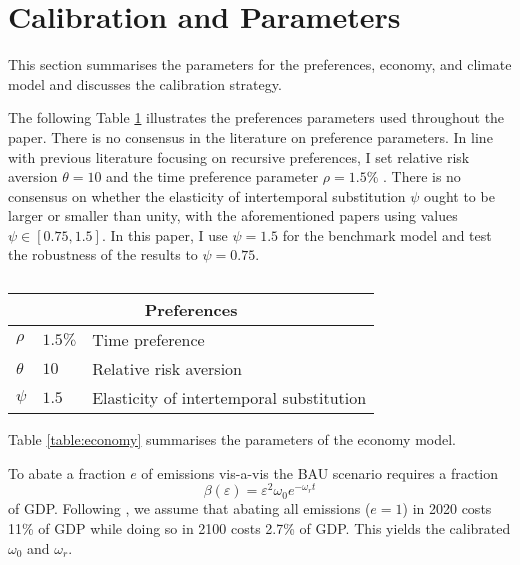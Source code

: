 \documentclass[../../main.tex]{subfiles}
\begin{document}
\section{Calibration and Parameters} \label{appendix:calibration}

This section summarises the parameters for the preferences, economy, and climate model and discusses the calibration strategy.

The following Table \ref{table:preferences} illustrates the preferences parameters used throughout the paper. There is no consensus in the literature on preference parameters. In line with previous literature focusing on recursive preferences, I set relative risk aversion $\theta = 10$ \citep{ackerman_epsteinzin_2013,crost_optimal_2013,lontzek_stochastic_2015} and the time preference parameter $\rho = 1.5\%$ \citep{nordhaus_estimates_2014}. There is no consensus on whether the elasticity of intertemporal substitution $\psi$ ought to be larger or smaller than unity, with the aforementioned papers using values $\psi \in [0.75, 1.5]$. In this paper, I use $\psi = 1.5$ for the benchmark model and test the robustness of the results to $\psi = 0.75$.

\begin{table}[htbp]
    \centering
    \begin{tabular}{ |p{1cm}||p{3cm}|p{8cm}|}
        \hline
        \multicolumn{3}{|c|}{Preferences} \\
        \hline
        $\rho$ & $1.5\%$ & Time preference \\
        $\theta$ & $10$ & Relative risk aversion \\
        $\psi$ & $1.5$ & Elasticity of intertemporal substitution \\
        \hline
    \end{tabular}
    \caption{}
    \label{table:preferences}
\end{table}

Table \ref{table:economy} summarises the parameters of the economy model. 

To abate a fraction $e$ of emissions vis-a-vis the BAU scenario requires a fraction \begin{equation}
    \beta(\varepsilon) = \varepsilon^2 
    \omega_0 e^{-\omega_r t}
\end{equation} of GDP. Following \citep{nordhaus_revisiting_2017}, we assume that abating all emissions ($e = 1$) in 2020 costs 11\% of GDP while doing so in 2100 costs 2.7\% of GDP. This yields the calibrated $\omega_0$ and $\omega_r$. %
\end{document}
